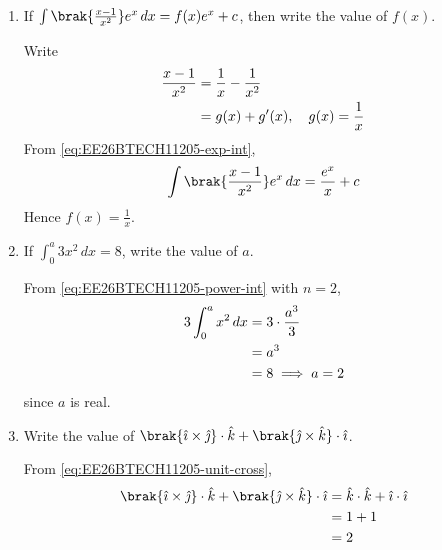 \begin{enumerate}[label=\thesubsection.\arabic*, ref=\thesubsection.\theenumi, itemsep=3ex]
\medskip
\solution
Let $\vec{R}_i$ denote the $i^{\text{th}}$ row. Then
\begin{align}
	\vec{R}_1 &= \myvec{102 & 18 & 36} \notag
	\\
	&= 6\myvec{17 & 3 & 6} \notag
	\\
	&= 6\vec{R}_3
\end{align}
The row operation $\vec{R}_1 \to \vec{R}_1 - 6\vec{R}_3$ gives a zero row. From \eqref{eq:EE26BTECH11205-det-prop}, the determinant is $0$.

\item
If $\int\brak{\frac{x-1}{x^2}}e^x\,dx = f(x)e^x + c$, then write the value of $f(x)$.

\medskip
\solution Write
\begin{align}
	\frac{x-1}{x^2} &= \frac{1}{x} - \frac{1}{x^2} \notag
	\\
	&= g(x) + g^{\prime}(x),\quad g(x) = \frac{1}{x}
\end{align}
From \eqref{eq:EE26BTECH11205-exp-int},
\begin{align}
	\int\brak{\frac{x-1}{x^2}}e^x\,dx = \frac{e^x}{x} + c
\end{align}
Hence $f(x) = \frac{1}{x}$.

\item
If $\int_{0}^{a}3x^2\,dx = 8$, write the value of $a$.

\medskip
\solution From \eqref{eq:EE26BTECH11205-power-int} with $n = 2$,
\begin{align}
	3\int_{0}^{a}x^2\,dx &= 3\cdot\frac{a^3}{3} \notag
	\\
	&= a^3 \notag
	\\
	&= 8 \implies a = 2
\end{align}
since $a$ is real.

\item
Write the value of $\brak{\hat{\imath}\times\hat{\jmath}}\cdot\hat{k} + \brak{\hat{\jmath}\times\hat{k}}\cdot\hat{\imath}$.

\medskip
\solution From \eqref{eq:EE26BTECH11205-unit-cross},
\begin{align}
	\brak{\hat{\imath}\times\hat{\jmath}}\cdot\hat{k} + \brak{\hat{\jmath}\times\hat{k}}\cdot\hat{\imath} &= \hat{k}\cdot\hat{k} + \hat{\imath}\cdot\hat{\imath} \notag
	\\
	&= 1 + 1 \notag
	\\
	&= 2
\end{align}


\end{enumerate}
